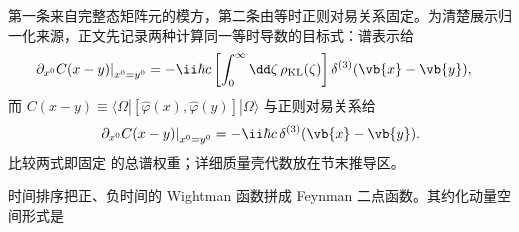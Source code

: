 第一条来自完整态矩阵元的模方，第二条由等时正则对易关系固定。为清楚展示归一化来源，正文先记录两种计算同一等时导数的目标式：谱表示给
\begin{align}
 \left.\partial_{x^0}C(x-y)\right|_{x^0=y^0}
 &=-\ii\hbar c
 \left[\int_0^\infty\dd\zeta\,\rho_{\rm KL}(\zeta)\right]
 \delta^{(3)}(\vb{x}-\vb{y}),
 \label{eq:KL-commutator-spectral-derivative-r15}
\end{align}
而 $C(x-y)\equiv\langle\Omega|[\hat\varphi(x),\hat\varphi(y)]|\Omega\rangle$ 与正则对易关系给
\begin{equation}
 \left.\partial_{x^0}C(x-y)\right|_{x^0=y^0}
 =-\ii\hbar c\,\delta^{(3)}(\vb{x}-\vb{y}).
 \label{eq:KL-commutator-canonical-r15}
\end{equation}
比较两式即固定 的总谱权重；详细质量壳代数放在节末推导区。

时间排序把正、负时间的 Wightman 函数拼成 Feynman 二点函数。其约化动量空间形式是


